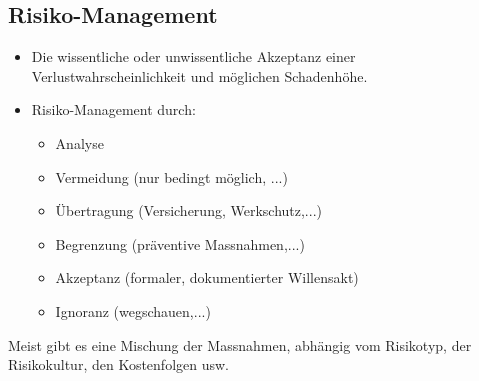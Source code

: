 \documentclass[a4paper, 10pt]{article}
\begin{document}
\subsection{Risiko-Management}
\begin{itemize}
	\item Die wissentliche oder unwissentliche Akzeptanz einer Verlustwahrscheinlichkeit und möglichen Schadenhöhe.
	\item Risiko-Management durch:
		\begin{itemize}
			\item Analyse
			\item Vermeidung (nur bedingt möglich, ...)
			\item \"Ubertragung (Versicherung, Werkschutz,...)
			\item Begrenzung (pr\"aventive Massnahmen,...)
			\item Akzeptanz (formaler, dokumentierter Willensakt)
			\item Ignoranz (wegschauen,...)
		\end{itemize}
\end{itemize}
Meist gibt es eine Mischung der Massnahmen, abh\"angig vom Risikotyp, der Risikokultur, den Kostenfolgen usw.
\end{document}
